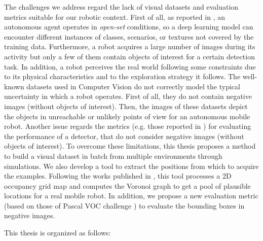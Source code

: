 The challenges we address regard the lack of visual datasets and evaluation metrics suitable for our robotic context. First of all, as reported in \cite{surveydeeplimits}, an autonomous agent operates in \textit{open-set} conditions, so a deep learning model can encounter different instances of classes, scenarios, or textures not covered by the training data. Furthermore, a robot acquires a large number of images during its activity but only a few of them contain objects of interest for a certain detection task. In addition, a robot perceives the real world following some constraints due to its physical characteristics and to the exploration strategy it follows. The well-known datasets used in Computer Vision \cite{coco, imagenet, pascal} do not correctly model the typical uncertainty in which a robot operates. First of all, they do not contain negative images (without objects of interest). Then, the images of these datasets depict the objects in unreachable or unlikely points of view for an autonomous mobile robot. Another issue regards the metrics (e.g. those reported in \cite{pascal, generalizediou, coco}) for evaluating the performance of a detector, that do not consider negative images (without objects of interest). To overcome these limitations, this thesis proposes a method to build a visual dataset in batch from multiple environments through simulations. We also develop a tool to extract the positions from which to acquire the examples. Following the works published in \cite{repeatabilityslamarxiv, repeatabilityslam}, this tool processes a 2D occupancy grid map and computes the Voronoi graph to get a pool of plausible locations for a real mobile robot. In addition, we propose a new evaluation metric (based on those of Pascal VOC challenge \cite{pascal}) to evaluate the bounding boxes in negative images. 

This thesis is organized as follows:

